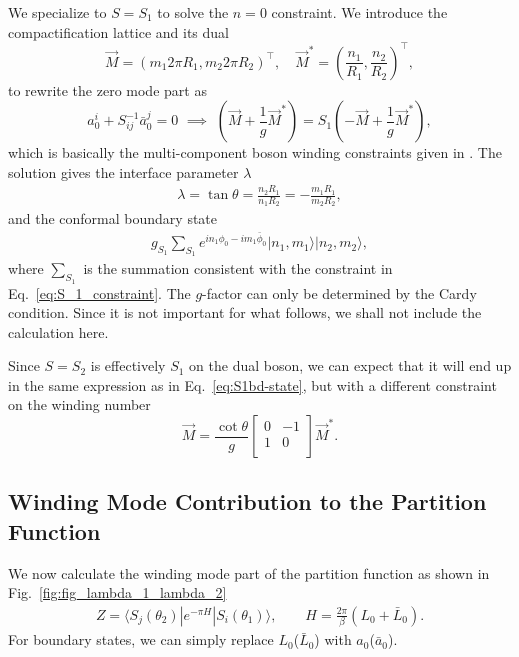 We specialize to $S = S_1$ to solve the $ n = 0$ constraint. We introduce the compactification lattice and its dual\cite{affleck_quantum_2001,oshikawa_boundary_2010}
\begin{equation}
\label{eq:lattice}
\vec{M} = (m_1 2 \pi R_1, m_2 2\pi  R_2)^\top, \quad  \vec{M}^* = (\frac{n_1}{R_1}, \frac{n_2}{R_2})^\top,
\end{equation}
to rewrite the zero mode part as 
\begin{equation}
  a_0^i + S^{-1} _{ij} \bar{a}_{0}^j = 0 \,\, \implies \,\, ( \vec{M} + \frac{1}{g}\vec{M}^* ) = S_1 ( -\vec{M} + \frac{1}{g}\vec{M}^* ),
\end{equation}
which is basically the multi-component boson winding constraints given in . The solution gives the interface parameter $\lambda$
\begin{equation}
\begin{aligned}
\label{eq:S_1_constraint}
\lambda = \tan\theta=\frac{n_2R_1}{n_1R_2}=-\frac{m_1R_1}{m_2R_2},
\end{aligned}
\end{equation}
and the conformal boundary state
\begin{equation}\begin{aligned}
\label{eq:S1bd-state}
g_{S_1}\sum_{S_1}e^{in_1\phi_0-im_1\bar{\phi}_0}|n_1,m_1\rangle|n_2,m_2\rangle,
\end{aligned}\end{equation}
where $\sum_{S_1}$ is the summation consistent with the constraint in Eq.~\eqref{eq:S_1_constraint}. The $g$-factor can only be determined by the Cardy condition\cite{cardy_boundary_2004}. Since it is not important for what follows, we shall not include the calculation here. 

Since $S = S_2$ is effectively $S_1$ on the dual boson, we can expect that it will end up in the same expression as in Eq.~\eqref{eq:S1bd-state}, but with a different constraint on the winding number
\begin{equation}
\vec{M} = \frac{\cot \theta}{g} 
\begin{bmatrix}
0 & -1\\
1 & 0 \\                                
\end{bmatrix}
\vec{M}^*.
\end{equation}

\subsection{Winding Mode Contribution to the Partition Function}
\label{app_sub:winding_contribution}
We now calculate the winding mode part of the partition function as shown in Fig.~\ref{fig:fig_lambda_1_lambda_2}
\begin{equation}\begin{aligned}
Z=\langle S_j( \theta_2 )|e^{-\pi H}|S_i(\theta_1 )\rangle,\qquad H=\frac{2\pi}{\beta}(L_0+\bar{L}_0).
\end{aligned}\end{equation}
For boundary states, we can simply replace $L_0$($\bar{L}_0$) with $a_0$($\bar{a}_0$). 

